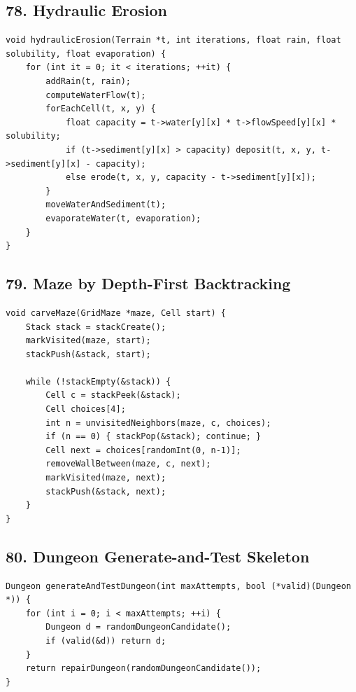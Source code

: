 \documentclass[10pt,letterpaper]{article}
\begin{document}
\subsection*{78. Hydraulic Erosion}
{}

\begin{verbatim}
void hydraulicErosion(Terrain *t, int iterations, float rain, float solubility, float evaporation) {
    for (int it = 0; it < iterations; ++it) {
        addRain(t, rain);
        computeWaterFlow(t);
        forEachCell(t, x, y) {
            float capacity = t->water[y][x] * t->flowSpeed[y][x] * solubility;
            if (t->sediment[y][x] > capacity) deposit(t, x, y, t->sediment[y][x] - capacity);
            else erode(t, x, y, capacity - t->sediment[y][x]);
        }
        moveWaterAndSediment(t);
        evaporateWater(t, evaporation);
    }
}
\end{verbatim}

\subsection*{79. Maze by Depth-First Backtracking}
{}

\begin{verbatim}
void carveMaze(GridMaze *maze, Cell start) {
    Stack stack = stackCreate();
    markVisited(maze, start);
    stackPush(&stack, start);

    while (!stackEmpty(&stack)) {
        Cell c = stackPeek(&stack);
        Cell choices[4];
        int n = unvisitedNeighbors(maze, c, choices);
        if (n == 0) { stackPop(&stack); continue; }
        Cell next = choices[randomInt(0, n-1)];
        removeWallBetween(maze, c, next);
        markVisited(maze, next);
        stackPush(&stack, next);
    }
}
\end{verbatim}

\subsection*{80. Dungeon Generate-and-Test Skeleton}
{}

\begin{verbatim}
Dungeon generateAndTestDungeon(int maxAttempts, bool (*valid)(Dungeon *)) {
    for (int i = 0; i < maxAttempts; ++i) {
        Dungeon d = randomDungeonCandidate();
        if (valid(&d)) return d;
    }
    return repairDungeon(randomDungeonCandidate());
}
\end{verbatim}
\end{document}

